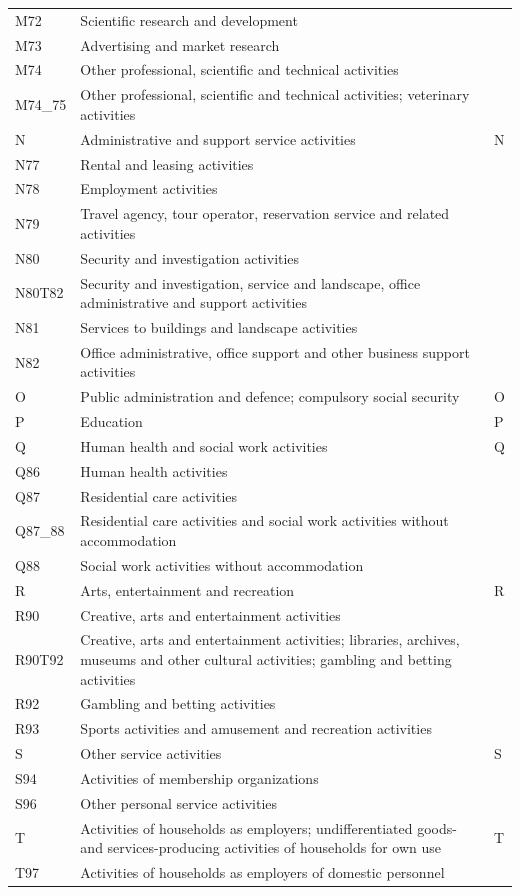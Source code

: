 \documentclass[12pt]{article}
\begin{document}
\begin{tabularx}{\textwidth}{l X l}
M72     & Scientific research and development &  \\
M73     & Advertising and market research &  \\
M74     & Other professional, scientific and technical activities &  \\
M74\_75 & Other professional, scientific and technical activities; veterinary activities &  \\
N       & Administrative and support service activities & N \\
N77     & Rental and leasing activities &  \\
N78     & Employment activities &  \\
N79     & Travel agency, tour operator, reservation service and related activities &  \\
N80     & Security and investigation activities &  \\
N80T82  & Security and investigation, service and landscape, office administrative and support activities &  \\
N81     & Services to buildings and landscape activities &  \\
N82     & Office administrative, office support and other business support activities &  \\
O       & Public administration and defence; compulsory social security & O \\
P       & Education & P \\
Q       & Human health and social work activities & Q \\
Q86     & Human health activities &  \\
Q87     & Residential care activities &  \\
Q87\_88 & Residential care activities and social work activities without accommodation &  \\
Q88     & Social work activities without accommodation &  \\
R       & Arts, entertainment and recreation & R \\
R90     & Creative, arts and entertainment activities &  \\
R90T92  & Creative, arts and entertainment activities; libraries, archives, museums and other cultural activities; gambling and betting activities &  \\
R92     & Gambling and betting activities &  \\
R93     & Sports activities and amusement and recreation activities &  \\
S       & Other service activities & S \\
S94     & Activities of membership organizations &  \\
S96     & Other personal service activities &  \\
T       & Activities of households as employers; undifferentiated goods- and services-producing activities of households for own use & T \\
T97     & Activities of households as employers of domestic personnel &  \\
\hline
\end{tabularx}
\end{document}
